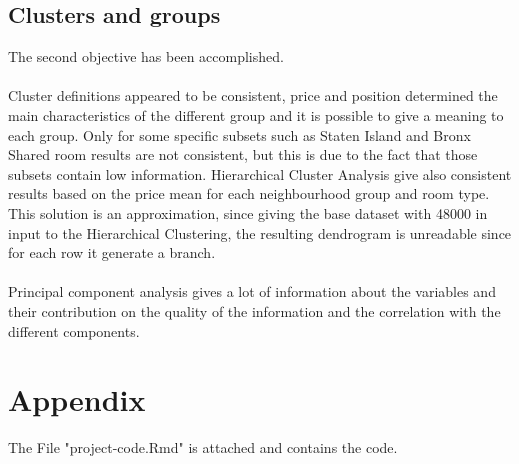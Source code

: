 \documentclass{FR16}
\begin{document}
\subsection{Clusters and groups}
The second objective has been accomplished.\\\\ Cluster definitions appeared to be consistent, price and position determined the main characteristics of the different group and it is possible to give a meaning to each group. Only for some specific subsets such as Staten Island and Bronx Shared room results are not consistent, but this is due to the fact that those subsets contain low information.
Hierarchical Cluster Analysis give also consistent results based on the price mean for each neighbourhood group and room type. This solution is an approximation, since giving the base dataset with 48000 in input to the Hierarchical Clustering, the resulting dendrogram is unreadable since for each row it generate a branch.
\\\\
Principal component analysis gives a lot of information about the variables and their contribution on the quality of the information and the correlation with the different components.



\newpage
\section{Appendix}
%
The File "project-code.Rmd" is attached and contains the code.

%
\end{document}
